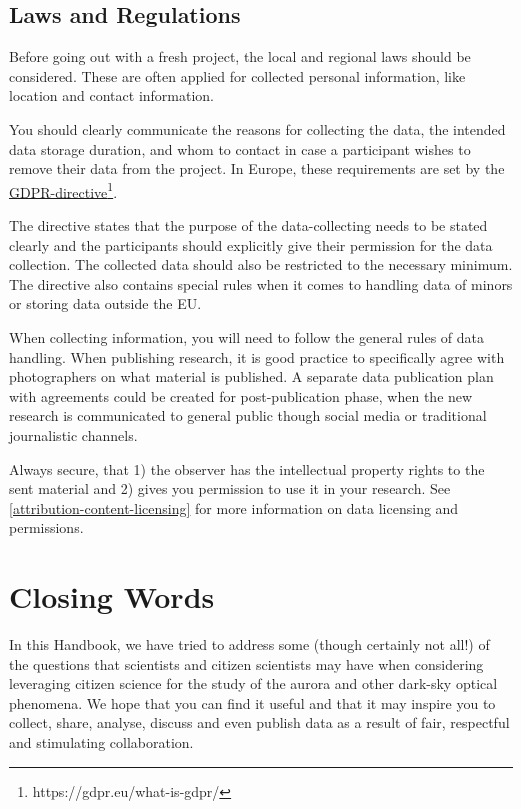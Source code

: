 \documentclass{article}
\newcommand{\contributed}[1]{%
    \par\noindent
    \begingroup
    \setlength{\leftskip}{1em}%
    \itshape
    Contributors: #1
    \par
    \endgroup
    \vspace{0.5em}
}
\begin{document}
\subsection{Laws and Regulations}\label{laws-and-regulations}

Before going out with a fresh project, the local and regional laws should be considered. These are often applied for collected personal information, like location and contact information.  

You should clearly communicate the reasons for collecting the data, the intended data storage duration, and whom to contact in case a participant wishes to remove their data from the project. In Europe, these requirements are set by the \href{https://gdpr.eu/what-is-gdpr/}{GDPR-directive}\footnote{https://gdpr.eu/what-is-gdpr/}.

The directive states that the purpose of the data-collecting needs to be stated clearly and the participants should explicitly give their permission for the data collection. The collected data should also be restricted to the necessary minimum. The directive also contains special rules when it comes to handling data of minors or storing data outside the EU.

When collecting information, you will need to follow the general rules of data handling. When publishing research, it is good practice to specifically agree with photographers on what material is published. A separate data publication plan with agreements could be created for post-publication phase, when the new research is communicated to general public though social media or traditional journalistic channels.  

Always secure, that 1) the observer has the intellectual property rights to the sent material and 2) gives you permission to use it in your research. See \ref{attribution-content-licensing} for more information on data licensing and permissions. 



\section{Closing Words}
In this Handbook, we have tried to address some (though certainly not all!) of the questions that scientists and citizen scientists may have when considering leveraging citizen science for the study of the aurora and other dark-sky optical phenomena. We hope that you can find it useful and that it may inspire you to collect, share, analyse, discuss and even publish data as a result of fair, respectful and stimulating collaboration.
\end{document}

